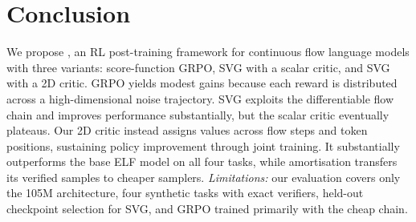 \section{Conclusion}
We propose \method{}, an RL post-training framework for continuous flow language models with three variants: score-function GRPO, SVG with a scalar critic, and SVG with a 2D critic. GRPO yields modest gains because each reward is distributed across a high-dimensional noise trajectory. SVG exploits the differentiable flow chain and improves performance substantially, but the scalar critic eventually plateaus. Our 2D critic instead assigns values across flow steps and token positions, sustaining policy improvement through joint training. It substantially outperforms the base ELF model on all four tasks, while amortisation transfers its verified samples to cheaper samplers. \emph{Limitations:} our evaluation covers only the 105M architecture, four synthetic tasks with exact verifiers, held-out checkpoint selection for SVG, and GRPO trained primarily with the cheap chain.
